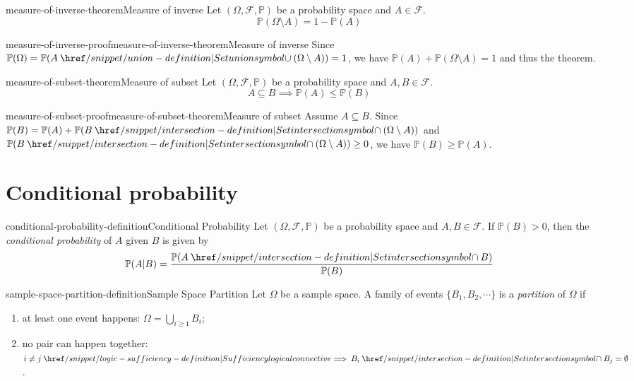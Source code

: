 \documentclass[preview]{standalone}
\begin{document}
\begin{snippettheorem}{measure-of-inverse-theorem}{Measure of inverse}
    Let \((\Omega, \mathcal{F}, \mathbb{P})\) be a probability space and \(A \in \mathcal{F}\).
    \[
        \mathbb{P}(\Omega \setminus A) = 1 - \mathbb{P}(A)
    \]
\end{snippettheorem}

\begin{snippetproof}{measure-of-inverse-proof}{measure-of-inverse-theorem}{Measure of inverse}
    Since \(\mathbb{P}(\Omega) = \mathbb{P}(A \union (\Omega \setminus A)) = 1\),
    we have \(\mathbb{P}(A) + \mathbb{P}(\Omega \setminus A) = 1\)
    and thus the theorem.
\end{snippetproof}

\begin{snippettheorem}{measure-of-subset-theorem}{Measure of subset}
    Let \((\Omega, \mathcal{F}, \mathbb{P})\) be a probability space and \(A, B \in \mathcal{F}\).
    \[
        A \subseteq B \implies \mathbb{P}(A) \leq \mathbb{P}(B)
    \]
\end{snippettheorem}

\begin{snippetproof}{measure-of-subset-proof}{measure-of-subset-theorem}{Measure of subset}
    Assume \(A \subseteq B\). Since \(\mathbb{P}(B) = \mathbb{P}(A) + \mathbb{P}(B \intersection (\Omega \setminus A))\)
    and \(\mathbb{P}(B \intersection (\Omega \setminus A)) \geq 0\), we have \(\mathbb{P}(B) \geq \mathbb{P}(A)\).
\end{snippetproof}

\section{Conditional probability}

\begin{snippetdefinition}{conditional-probability-definition}{Conditional Probability}
    Let \((\Omega, \mathcal{F}, \mathbb{P})\) be a probability space
    and \(A, B \in \mathcal{F}\).
    If \(\mathbb{P}(B) > 0\), then the \textit{conditional probability} of \(A\) given \(B\)
    is given by
    \[
        \mathbb{P}(A|B) = \frac{\mathbb{P}(A \intersection B)}{\mathbb{P}(B)}
    \]
\end{snippetdefinition}

\begin{snippetdefinition}{sample-space-partition-definition}{Sample Space Partition}
    Let \(\Omega\) be a sample space.
    A family of events \(\{B_1,B_2, \cdots\}\)
    is a \textit{partition} of \(\Omega\) if
    \begin{enumerate}
        \item at least one event happens: \(\Omega = \bigcup_{i \geq 1} B_i\);
        \item no pair can happen together: \(i \neq j \implies B_i \intersection B_j = \emptyset\).
    \end{enumerate}
\end{snippetdefinition}
\end{document}
